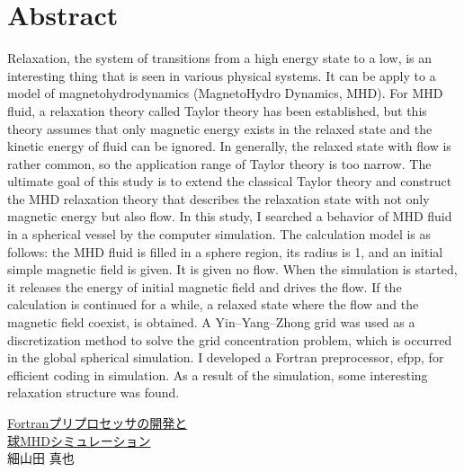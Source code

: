 \documentclass[12pt]{jsarticle}
\begin{document}
\section*{Abstract}
Relaxation, the system of transitions from a high energy state to a low, is an interesting thing that is seen in various physical systems. It can be apply to a model of magnetohydrodynamics (MagnetoHydro Dynamics, MHD). For MHD fluid, a relaxation theory called Taylor theory has been established, but this theory assumes that only magnetic energy exists in the relaxed state and the kinetic energy of fluid can be ignored. In generally, the relaxed state with flow is rather common, so the application range of Taylor theory is too narrow. The ultimate goal of this study is to extend the classical Taylor theory and construct the MHD relaxation theory that describes the relaxation state with not only magnetic energy but also flow. In this study, I searched a behavior of MHD fluid in a spherical vessel by the computer simulation. The calculation model is as follows: the MHD fluid is filled in a sphere region, its radius is 1, and an initial simple magnetic field is given. It is given no flow. When the simulation is started, it releases the energy of initial magnetic field and drives the flow. If the calculation is continued for a while, a relaxed state where the flow and the magnetic field coexist, is obtained. A Yin--Yang--Zhong grid was used as a discretization method to solve the grid concentration problem, which is occurred in the global spherical simulation. I developed a Fortran preprocessor, efpp, for efficient coding in simulation. As a result of the simulation, some interesting relaxation structure was found.


\newpage
\thispagestyle{empty}
\begin{center}
\Large{\underline{Fortranプリプロセッサの開発と}}\\
\Large{\underline{球MHDシミュレーション}}\\
\vspace{1.5cm}
\large{細山田 真也}
\end{center}
\vspace{1cm}
\end{document}
